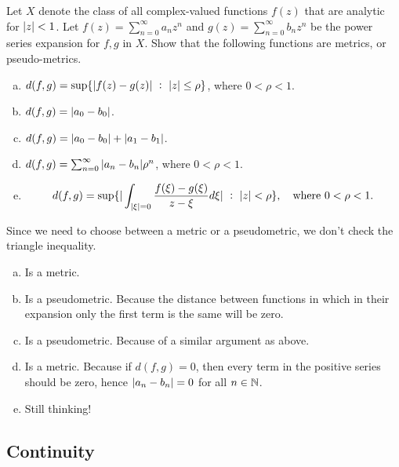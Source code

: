 \begin{problem}
	Let $ X $ denote the class of all complex-valued functions $ f(z) $ that are analytic for $ |z| < 1 $. Let $ f(z) = \sum_{n=0}^{\infty} a_nz^n $ and $ g(z) = \sum_{n=0}^{\infty} b_n z^n $ be the power series expansion for $ f,g $ in $ X $. Show that the following functions are metrics, or pseudo-metrics.
	\begin{enumerate}[(a)]
		\item $ d(f,g) = \sup\set{\abs{f(z)-g(z)}\ :\ \abs{z}\leq \rho} $, where $ 0 < \rho < 1 $.
		\item $ d(f,g) = |a_0 - b_0| $.
		\item $ d(f,g) = |a_0 - b_0| + |a_1 - b_1| $.
		\item $ d(f,g) = \sum_{n=0}^{\infty} |a_n - b_n|\rho^n $, where $ 0<\rho<1 $.
		\item 
		\[ d(f,g) = \sup\set{\abs{\int_{\abs{\xi}=0} \frac{f(\xi) - g(\xi)}{z-\xi}d\xi}\ :\ \abs{z} < \rho}, \quad \text{where $ 0<\rho<1 $.} \]
	\end{enumerate}
\end{problem}

\begin{solution}
	Since we need to choose between a metric or a pseudometric, we don't check the triangle inequality.
	\begin{enumerate}[(a)]
		\item Is a metric. 
		\item Is a pseudometric. Because the distance between functions in which in their expansion only the first term is the same will be zero.
		\item Is a pseudometric. Because of a similar argument as above.
		\item Is a metric. Because if $ d(f,g) = 0 $, then every term in the positive series should be zero, hence $ |a_n - b_n| = 0 $ for all $ n\in \mathbb{N} $.
		\item {\color{red} \noindent Still thinking!}
	\end{enumerate}
\end{solution}



\subsection{Continuity}


